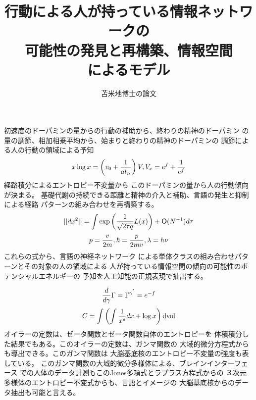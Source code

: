 \documentclass{jsarticle}
\begin{document}
\title{行動による人が持っている情報ネットワークの \\
可能性の発見と再構築、情報空間 \\
によるモデル}
\author{苫米地博士の論文}
\date{}
\maketitle

      初速度のドーパミンの量からの行動の補助から、終わりの精神のドーパミン
  の量の調節、相加相乗平均から、始まりと終わりの精神のドーパミンの
  調節による人の行動の領域による予知
  $$ x \log x = \left(v_0 + {1 \over at_n}\right)V, V_x = e^f + {1 \over e^f} $$
     経路積分によるエントロピー不変量から
  このドーパミンの量から人の行動傾向が決まる。
  基礎代謝の持続できる距離と精神の介入と補助、言語の発生と抑制による経路
  パターンの組み合わせを再構築する。
  $$ ||dx^2|| = \int {\mathrm{exp}\left({1 \over \sqrt{2 \tau q}}L(x)
  \right) + \mathrm{O}(N^{-1})}d \tau   $$
  $$ p = {v \over 2m}, \hbar = {p \over 2mv}, \lambda = h \nu $$
     これらの式から、言語の神経ネットワーク
  による単体クラスの組み合わせパターンとその対象の人の領域による
  人が持っている情報空間の傾向の可能性のポテンシャルエネルギーの
  予知を人工知能の正規表現で抽出する。
   
  $$ {d \over d \gamma}\Gamma = \Gamma^{{\gamma}^{'}} = e^{-f}  $$
  $$ C = \int \left(\int {1 \over x^s}dx + \log x \right)\mathrm{dvol} $$
  オイラーの定数は、ゼータ関数とゼータ関数自体のエントロピーを
  体積積分した結果でもある。このオイラーの定数は、ガンマ関数の
  大域的微分方程式からも導出できる。このガンマ関数は
  大脳基底核のエントロピー不変量の強度も表している。
  このガンマ関数の大域的微分多様体による、ブレインインターフェース
  での人体のデータ計測もこのJones多項式とラプラス方程式からの
  ３次元多様体のエントロピー不変式からも、言語とイメージの
  大脳基底核からのデータ抽出も可能と言える。
\end{document}

